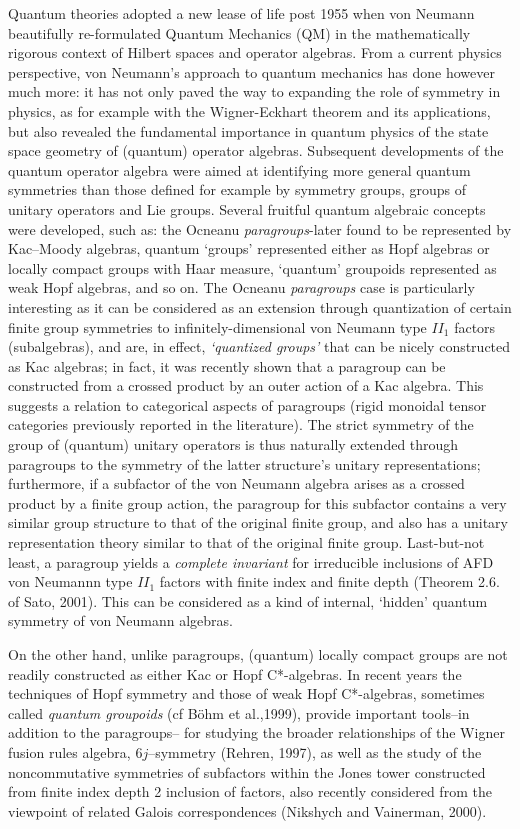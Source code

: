 \documentclass[12pt]{article}
\theoremstyle{plain}
\theoremstyle{definition}
\numberwithin{equation}{section}
\newcommand{\<}{{\langle}}
\begin{document}
Quantum theories adopted a new lease of life post 1955 when von Neumann beautifully re-formulated Quantum Mechanics (QM) in the mathematically rigorous context of Hilbert spaces and operator algebras. From a current physics perspective, von Neumann's approach to quantum mechanics has done however much more: it has not only paved the way to expanding the role of symmetry in
physics, as for example with the Wigner-Eckhart theorem and its
applications, but also revealed the fundamental importance in
quantum physics of the state space geometry of (quantum) operator
algebras. Subsequent developments of the quantum operator algebra were aimed at identifying more general quantum symmetries than those defined for example by symmetry groups, groups of unitary operators and Lie groups. Several fruitful quantum algebraic concepts were developed, such as: the Ocneanu \textit{paragroups}-later found to be represented by Kac--Moody algebras, quantum `groups' represented either as Hopf algebras or locally compact groups with Haar measure, `quantum' groupoids represented as weak Hopf algebras, and so on. The Ocneanu {\em paragroups} case is particularly interesting as it can be considered as an extension through quantization of certain finite group symmetries to infinitely-dimensional von Neumann type $II_1$ factors (subalgebras), and are, in effect, \textit{`quantized groups'} that can be nicely constructed as Kac algebras; in fact, it was recently shown that a paragroup can be constructed from a crossed product by an outer action of a Kac algebra. This suggests a relation to categorical aspects of paragroups (rigid monoidal tensor categories previously reported in the literature). The strict symmetry of the group of (quantum) unitary operators is thus naturally extended through paragroups to the symmetry of the latter structure's unitary representations; furthermore, if a subfactor of the von Neumann algebra arises as a crossed product by a finite group action, the paragroup for this subfactor contains a very similar group structure to that of the original finite group, and also has a unitary representation theory similar to that of the original finite group. Last-but-not least, a paragroup yields a \emph{complete invariant} for irreducible inclusions of AFD von Neumannn type $II_1$ factors with finite index and finite depth (Theorem 2.6. of Sato, 2001). This can be considered as a kind of internal, `hidden' quantum symmetry of von Neumann algebras.

On the other hand, unlike paragroups, (quantum) locally compact groups are not readily constructed as either Kac or Hopf C*-algebras. In recent years the techniques of Hopf symmetry and those of weak Hopf C*-algebras, sometimes called \emph{quantum groupoids} (cf B\"ohm et al.,1999),
provide important tools--in addition to the paragroups-- for studying the broader relationships of the Wigner fusion rules algebra, $6j$--symmetry (Rehren, 1997), as well as the study of the noncommutative
symmetries of subfactors within the Jones tower constructed from finite index depth 2 inclusion of factors, also recently considered from the viewpoint of related Galois correspondences (Nikshych and Vainerman, 2000).
\end{document}
